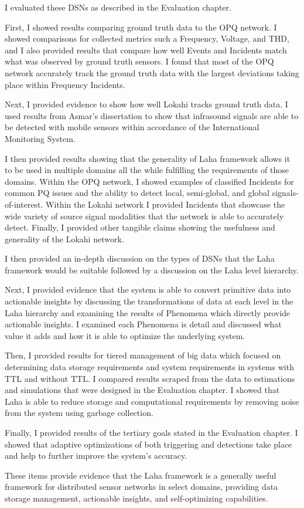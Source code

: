 I evaluated these DSNs as described in the Evaluation chapter.

First, I showed results comparing ground truth data to the OPQ network. I showed comparisons for collected metrics such a Frequency, Voltage, and THD, and I also provided results that compare how well Events and Incidents match what was observed by ground truth sensors. I found that most of the OPQ network accurately track the ground truth data with the largest deviations taking place within Frequency Incidents.

Next, I provided evidence to show how well Lokahi tracks ground truth data. I used results from Asmar's dissertation to show that infrasound signals are able to be detected with mobile sensors within accordance of the International Monitoring System.

I then provided results showing that the generality of Laha framework allows it to be used in multiple domains all the while fulfilling the requirements of those domains. Within the OPQ network, I showed examples of classified Incidents for common PQ issues and the ability to detect local, semi-global, and global signals-of-interest. Within the Lokahi network I provided Incidents that showcase the wide variety of source signal modalities that the network is able to accurately detect. Finally, I provided other tangible claims showing the usefulness and generality of the Lokahi network.

I then provided an in-depth discussion on the types of DSNs that the Laha framework would be suitable followed by a discussion on the Laha level hierarchy.

Next, I provided evidence that the system is able to convert primitive data into actionable insights by discussing the transformations of data at each level in the Laha hierarchy and examining the results of Phenomena which directly provide actionable insights. I examined each Phenomena is detail and discussed what value it adds and how it is able to optimize the underlying system.

Then, I provided results for tiered management of big data which focused on determining data storage requirements and system requirements in systems with TTL and without TTL. I compared results scraped from the data to estimations and simulations that were designed in the Evaluation chapter. I showed that Laha is able to reduce storage and computational requirements by removing noise from the system using garbage collection.

Finally, I provided results of the tertiary goals stated in the Evaluation chapter. I showed that adaptive optimizations of both triggering and detections take place and help to further improve the system's accuracy.

These items provide evidence that the Laha framework is a generally useful framework for distributed sensor networks in select domains, providing data storage management, actionable insights, and self-optimizing capabilities.


